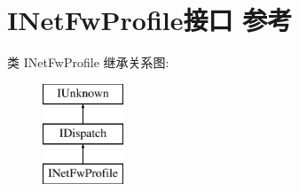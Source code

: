 \hypertarget{interface_i_net_fw_profile}{}\section{I\+Net\+Fw\+Profile接口 参考}
\label{interface_i_net_fw_profile}
类 I\+Net\+Fw\+Profile 继承关系图\+:\begin{figure}[H]
\begin{center}
\leavevmode
\includegraphics[height=3.000000cm]{interface_i_net_fw_profile}
\end{center}
\end{figure}
